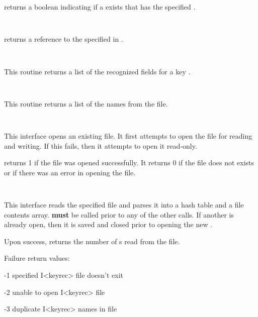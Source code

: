 \begin{description}
 returns a boolean indicating if a 
exists that has the specified .

\item {}\verb" "

 returns a reference to the  specified
in .

\item {}\verb" "

This routine returns a list of the recognized fields for a key .

\item {}\verb" "

This routine returns a list of the  names from the file.

\item {}\verb" "

This interface opens an existing  file.  It first attempts to
open the  file for reading and writing.  If this fails, then it
attempts to open it read-only.

 returns 1 if the file was opened successfully.  It
returns 0 if the file does not exists or if there was an error in opening the
file.

\item {}\verb" "

This interface reads the specified  file and parses it into a
 hash table and a file contents array.  
{\bf must} be called prior to any of the other
 calls.  If another  is already
open, then it is saved and closed prior to opening the new .

Upon success,  returns the number of s
read from the file.

Failure return values:

\begin{description}
\item -1 specified I<keyrec> file doesn't exit
\item -2 unable to open I<keyrec> file
\item -3 duplicate I<keyrec> names in file
\end{description}

\item {}\verb" "


\end{description}
